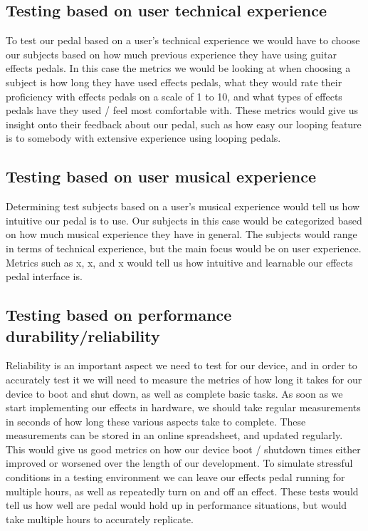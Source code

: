 \documentclass{article}
\begin{document}
\subsection{Testing based on user technical experience}
To test our pedal based on a user's technical experience we would have to choose our subjects based on how much previous experience they have using guitar effects pedals. In this case the metrics we would be looking at when choosing a subject is how long they have used effects pedals, what they would rate their proficiency with effects pedals on a scale of 1 to 10, and what types of effects pedals have they used / feel most comfortable with. These metrics would give us insight onto their feedback about our pedal, such as how easy our looping feature is to somebody with extensive experience using looping pedals.

\subsection{Testing based on user musical experience}
Determining test subjects based on a user's musical experience would tell us how intuitive our pedal is to use. Our subjects in this case would be categorized based on how much musical experience they have in general. The subjects would range in terms of technical experience, but the main focus would be on user experience. Metrics such as x, x, and x would tell us how intuitive and learnable our effects pedal interface is. 

\subsection{Testing based on performance durability/reliability}
Reliability is an important aspect we need to test for our device, and in order to accurately test it we will need to measure the metrics of how long it takes for our device to boot and shut down, as well as complete basic tasks. As soon as we start implementing our effects in hardware, we should take regular measurements in seconds of how long these various aspects take to complete. These measurements can be stored in an online spreadsheet, and updated regularly. This would give us good metrics on how our device boot / shutdown times either improved or worsened over the length of our development. To simulate stressful conditions in a testing environment we can leave our effects pedal running for multiple hours, as well as repeatedly turn on and off an effect. These tests would tell us how well are pedal would hold up in performance situations, but would take multiple hours to accurately replicate.
\end{document}
